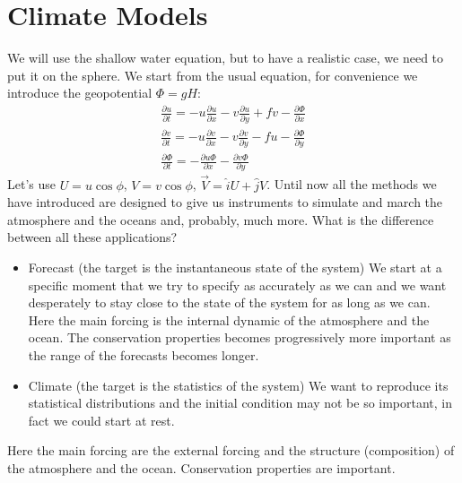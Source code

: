 
\chapter{Climate Models}
We will use the shallow water equation, but to have a realistic case, we need to put it on the sphere. We start from the usual equation, for convenience we introduce the geopotential $\Phi=gH$:
\begin{align}
	\frac{\partial u}{\partial t}=-u\frac{\partial u}{\partial x}-v\frac{\partial u}{\partial y}+fv-\frac{\partial \Phi}{\partial x} \\
	\frac{\partial v}{\partial t}=-u\frac{\partial v}{\partial x}-v\frac{\partial v}{\partial y}-fu-\frac{\partial \Phi}{\partial y} \\
	\frac{\partial \Phi}{\partial t}=-\frac{\partial u\Phi}{\partial x}-\frac{\partial v\Phi}{\partial y}
\end{align}
Let's use $U=u\cos\phi$, $V=v\cos\phi$, $\vec{V}=\hat{i}U+\hat{j}V$. Until now all the methods we have introduced are designed to give us instruments to simulate and march the atmosphere and the oceans and, probably, much more.
What is the difference between all these applications?
\begin{itemize}
	\item Forecast (the target is the instantaneous state of the system)
	      We start at a specific moment that we try to specify as accurately as we can and we want desperately to stay close to the state of the system for as long as we can.
	      Here the main forcing is the internal dynamic of the atmosphere and the ocean. The conservation properties becomes progressively more important as the range of the forecasts becomes longer.
	\item Climate (the target is the statistics of the system)
	      We want to reproduce its statistical distributions and the initial condition may not be so important, in fact we could start at rest.
\end{itemize}
Here the main forcing are the external forcing and the structure (composition) of the atmosphere and the ocean. Conservation properties are important.


